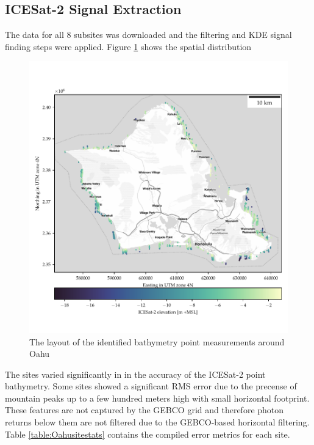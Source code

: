 \subsection{ICESat-2 Signal Extraction}

The data for all 8 subsites was downloaded and the filtering and KDE signal finding steps were applied. Figure \ref{fig:oahu-all-photon-map} shows the spatial distribution

\begin{figure}[h]
    \centering
    \includegraphics[width=\textwidth]{figures/Oahu_all_sites_photon_points.pdf}
    \caption{The layout of the identified bathymetry point measurements around Oahu}
    \label{fig:oahu-all-photon-map}
\end{figure}

The sites varied significantly in in the accuracy of the ICESat-2 point bathymetry. Some sites showed a significant RMS error due to the precense of mountain peaks up to a few hundred meters high with small horizontal footprint. These features are not captured by the GEBCO grid and therefore photon returns below them are not filtered due to the GEBCO-based horizontal filtering. Table \ref{table:Oahusitestats} contains the compiled error metrics for each site.

 

